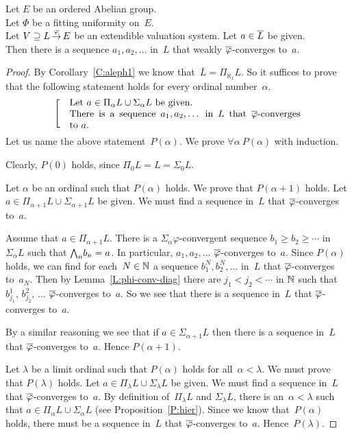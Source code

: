 \documentclass[main.tex]{subfiles}
\begin{document}
%
%
\begin{lem}
\label{L:fitting-phi-conv-dense}
Let $E$ be an ordered Abelian group.\\
Let $\Phi$ be a fitting uniformity on~$E$.\\
Let $V \supseteq L\,\smash{\stackrel{\varphi}{\rightarrow}}\,E$ be an extendible valuation system.
Let $a\in \overline L$ be given.\\
Then there is a sequence
$a_1,a_2,\dotsc$ in~$L$
that weakly $\overline\varphi$-converges to~$a$.
\end{lem}
\begin{proof}
By Corollary~\ref{C:aleph1}
we know that~$\overline L = \Pi_{\aleph_1} L$.
So it suffices to prove that
the following statement holds for every ordinal number~$\alpha$.
\begin{equation*}
\left[\quad
\begin{minipage}{.7\columnwidth}
Let $a\in \Pi_\alpha L\cup \Sigma_\alpha L$ be given.\\
There is a sequence $a_1,a_2,\dotsc$ in~$L$
that $\ol\varphi$-converges to~$a$.
\end{minipage}
\right.
\end{equation*}
Let us name the above statement~$P(\alpha)$.
We prove $\forall\alpha\ P(\alpha)$ with induction.

Clearly, $P(0)$ holds,
since $\Pi_0 L = L = \Sigma_0 L$.

\vspace{.3em}
Let $\alpha$ be an ordinal  such that $P(\alpha)$ holds.
We prove that $P(\alpha+1)$ holds.
Let $a\in \Pi_{\alpha+1}L \cup \Sigma_{\alpha+1} L$ be given.
We must find a sequence in~$L$ that
$\overline\varphi$-converges to~$a$.

Assume that $a\in \Pi_{\alpha+1} L$.
There is a $\Sigma_\alpha\varphi$-convergent
sequence $b_1 \geq b_2 \geq \dotsb$ in $\Sigma_\alpha L$
such that $\textstyle{\bigwedge}_n b_n = a$.
In particular, $a_1,a_2,\dotsc$ $\overline\varphi$-converges to~$a$.
Since $P(\alpha)$ holds,
we can find for each~$N\in \mathbb{N}$ a
sequence $b^N_1, b^N_2,\dotsc$ in~$L$
that $\overline\varphi$-converges to~$a_N$.
Then by Lemma~\ref{L:phi-conv-diag}
there are $j_1 < j_2 < \dotsb$ in $\mathbb{N}$
such that $b^1_{j_1},\, b^2_{j_2},\,\dotsc$
$\overline\varphi$-converges to~$a$.
So we see that there is a sequence in~$L$
that $\overline\varphi$-converges to~$a$.

By a similar reasoning
we see that if $a\in \Sigma_{\alpha+1}L$
then there is a sequence in~$L$ 
that $\overline\varphi$-converges to~$a$.
Hence $P(\alpha+1)$.

\vspace{.3em}
Let $\lambda$ be a limit ordinal
such that $P(\alpha)$ holds
for all~$\alpha<\lambda$.
We must prove that $P(\lambda)$ holds.
Let $a\in \Pi_\lambda L\cup \Sigma_\lambda L$ be given.
We must find a sequence in~$L$ that $\overline\varphi$-converges to~$a$.
By definition of~$\Pi_\lambda L$ and $\Sigma_\lambda L$,
there is an~$\alpha<\lambda$
such that $a \in \Pi_\alpha L \cup \Sigma_\alpha L$
(see Proposition~\ref{P:hier}).
Since we know that~$P(\alpha)$ holds,
there must be a sequence in~$L$ that $\overline\varphi$-converges to~$a$.
Hence~$P(\lambda)$.
\end{proof}
\end{document}
